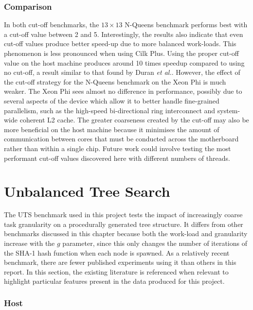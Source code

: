\documentclass{report}
\begin{document}
\subsubsection{Comparison}
In both cut-off benchmarks, the \(13 \times 13\) N-Queens benchmark performs best with a cut-off value between 2 and 5. Interestingly, the results also indicate that even cut-off values produce better speed-up due to more balanced work-loads. This phenomenon is less pronounced when using Cilk Plus. Using the proper cut-off value on the host machine produces around 10 times speedup compared to using no cut-off, a result similar to that found by Duran \textit{et al.}\cite{Duran09}. However, the effect of the cut-off strategy for the N-Queens benchmark on the Xeon Phi is much weaker. The Xeon Phi sees almost no difference in performance, possibly due to several aspects of the device which allow it to better handle fine-grained parallelism, such as the high-speed bi-directional ring interconnect and system-wide coherent L2 cache. The greater coarseness created by the cut-off may also be more beneficial on the host machine because it minimises the amount of communication between cores that must be conducted across the motherboard rather than within a single chip. Future work could involve testing the most performant cut-off values discovered here with different numbers of threads.

\section{Unbalanced Tree Search} \label{Sec:evaluts}

The UTS benchmark used in this project tests the impact of increasingly coarse task granularity on a procedurally generated tree structure. It differs from other benchmarks discussed in this chapter because both the work-load and granularity increase with the \(g\) parameter, since this only changes the number of iterations of the SHA-1 hash function when each node is spawned. As a relatively recent benchmark, there are fewer published experiments using it than others in this report. In this section, the existing literature is referenced when relevant to highlight particular features present in the data produced for this project.

\subsubsection{Host}
\end{document}
